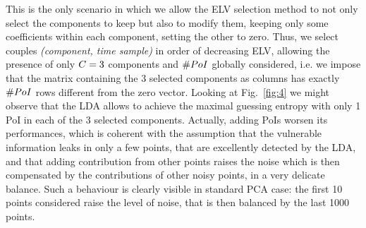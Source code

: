 This is the only scenario in which we allow the ELV selection method to not only select the components to keep but also to modify them, keeping only some coefficients within each component, setting the other to zero. Thus, we select couples \textit{(component, time sample)} in order of decreasing ELV, allowing the presence of only $C = 3$ components and $\# PoI$ globally considered, {i.e.} we impose that the matrix containing the 3 selected components as columns has exactly $\# PoI$ rows different from the zero vector. 
Looking at Fig.~\ref{fig:4} we might observe that the LDA allows to achieve the maximal guessing entropy with only 1 PoI in each of the 3 selected components. 
Actually, adding PoIs worsen its performances, which is coherent with the assumption that the vulnerable information leaks in only a few points, that are excellently detected by the LDA, and that adding contribution from other points raises the noise which is then compensated by the contributions of other noisy points, in a very delicate balance. Such a behaviour is clearly visible in standard PCA case: the first 10 points considered raise the level of noise, that is then balanced by the last 1000 points.




